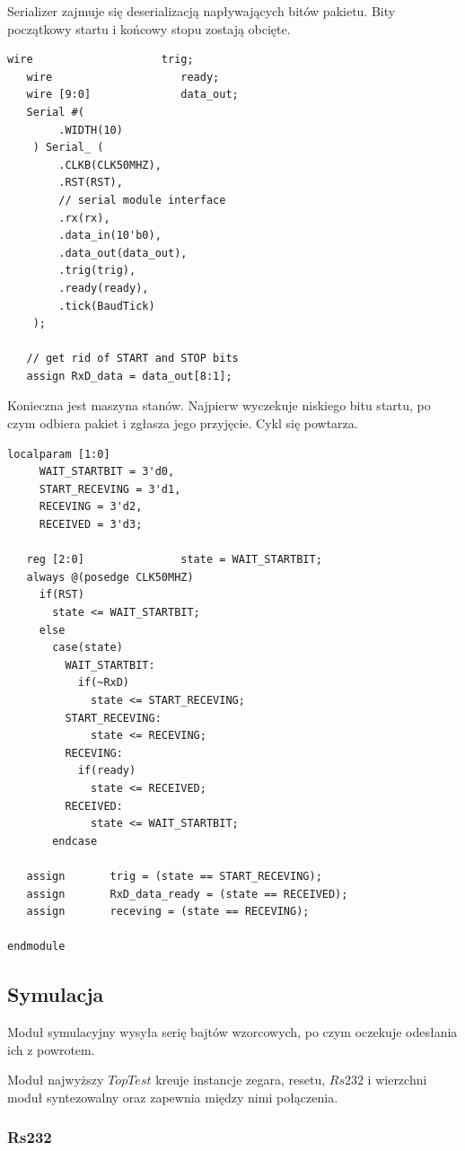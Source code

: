 \documentclass[a4paper,12pt]{article}
\begin{document}
Serializer zajmuje się deserializacją napływających bitów pakietu. Bity początkowy startu i końcowy stopu zostają obcięte.
\begin{lstlisting}[label=Rs232Rx,caption=Rs232Rx.v,firstnumber=59]
   wire                    trig;
   wire                    ready;
   wire [9:0]              data_out;
   Serial #(
        .WIDTH(10)
    ) Serial_ (
        .CLKB(CLK50MHZ),
        .RST(RST),
        // serial module interface
        .rx(rx),
        .data_in(10'b0),
        .data_out(data_out),
        .trig(trig),
        .ready(ready),
        .tick(BaudTick)
    );

   // get rid of START and STOP bits
   assign RxD_data = data_out[8:1];
\end{lstlisting}

Konieczna jest maszyna stanów. Najpierw wyczekuje niskiego bitu startu, po czym odbiera pakiet i zgłasza jego przyjęcie. Cykl się powtarza.
\begin{lstlisting}[label=Rs232Rx,caption=Rs232Rx.v,firstnumber=79]
   localparam [1:0]
     WAIT_STARTBIT = 3'd0,
     START_RECEVING = 3'd1,
     RECEVING = 3'd2,
     RECEIVED = 3'd3;

   reg [2:0]               state = WAIT_STARTBIT;
   always @(posedge CLK50MHZ)
     if(RST)
       state <= WAIT_STARTBIT;
     else
       case(state)
         WAIT_STARTBIT:
           if(~RxD)
             state <= START_RECEVING;
         START_RECEVING:
             state <= RECEVING;
         RECEVING:
           if(ready)
             state <= RECEIVED;
         RECEIVED:
             state <= WAIT_STARTBIT;
       endcase

   assign       trig = (state == START_RECEVING);
   assign       RxD_data_ready = (state == RECEIVED);
   assign       receving = (state == RECEVING);

endmodule
\end{lstlisting}

\subsection{Symulacja}

Moduł symulacyjny wysyła serię bajtów wzorcowych, po czym oczekuje odesłania ich z powrotem.

Moduł najwyższy $TopTest$ kreuje instancje zegara, resetu, $Rs232$ i wierzchni moduł syntezowalny oraz zapewnia między nimi połączenia.


\subsubsection{Rs232}
\end{document}
